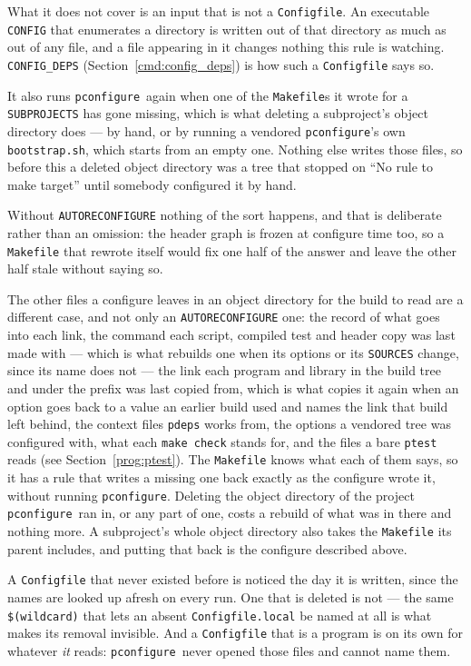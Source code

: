 \documentclass{article}
\newcommand{\pconfigure}{\texttt{pconfigure}}
\begin{document}
What it does not cover is an input that is not a \texttt{Configfile}.
An executable \texttt{CONFIG} that enumerates a directory is written
out of that directory as much as out of any file, and a file appearing
in it changes nothing this rule is watching.  \texttt{CONFIG\_DEPS}
(Section~\ref{cmd:config_deps}) is how such a \texttt{Configfile} says
so.

It also runs \pconfigure\ again when one of the \texttt{Makefile}s it
wrote for a \texttt{SUBPROJECTS} has gone missing, which is what
deleting a subproject's object directory does --- by hand, or by
running a vendored \pconfigure's own \texttt{bootstrap.sh}, which
starts from an empty one.  Nothing else writes those files, so before
this a deleted object directory was a tree that stopped on ``No rule
to make target'' until somebody configured it by hand.

Without \texttt{AUTORECONFIGURE} nothing of the sort happens, and that
is deliberate rather than an omission: the header graph is frozen at
configure time too, so a \texttt{Makefile} that rewrote itself would
fix one half of the answer and leave the other half stale without
saying so.

The other files a configure leaves in an object directory for the
build to read are a different case, and not only an
\texttt{AUTORECONFIGURE} one: the record of what goes into each link,
the command each script, compiled test and header copy was last made
with --- which is what rebuilds one when its options or its
\texttt{SOURCES} change, since its name does not --- the link each
program and library in the build tree and under the prefix was last
copied from, which is what copies it again when an option goes back
to a value an earlier build used and names the link that build left
behind, the context files
\texttt{pdeps} works from, the options a vendored tree was
configured with, what each \texttt{make check} stands for, and the
files a bare \texttt{ptest} reads (see Section~\ref{prog:ptest}).  The
\texttt{Makefile} knows what
each of them says, so it has a rule that writes a missing one back
exactly as the configure wrote it, without running \pconfigure.
Deleting the object directory of the project \pconfigure\ ran in, or
any part of one, costs a rebuild of what was in there and nothing
more.  A subproject's whole object directory also takes the
\texttt{Makefile} its parent includes, and putting that back is the
configure described above.

A \texttt{Configfile} that never existed before is noticed the day it
is written, since the names are looked up afresh on every run.  One
that is deleted is not --- the same \texttt{\$(wildcard)} that lets an
absent \texttt{Configfile.local} be named at all is what makes its
removal invisible.  And a \texttt{Configfile} that is a program is on
its own for whatever \emph{it} reads: \pconfigure\ never opened those
files and cannot name them.
\end{document}
